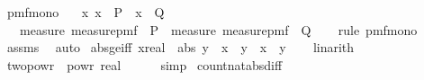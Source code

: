 \begin{isabellebody}
%
\endisatagproof
{\isafoldproof}%
%
\isadelimproof
\isanewline
%
\endisadelimproof
\isanewline
{}\isamarkupfalse%
\ pmf{\isacharunderscore}{\kern0pt}mono{\isacharcolon}{\kern0pt}\isanewline
\ \ \ {\isachardoublequoteopen}{\isasymAnd}x{\isachardot}{\kern0pt}\ x\ {\isasymin}\ P\ {\isasymLongrightarrow}\ x\ {\isasymin}\ Q{\isachardoublequoteclose}\isanewline
\ \ \ {\isachardoublequoteopen}measure\ {\isacharparenleft}{\kern0pt}measure{\isacharunderscore}{\kern0pt}pmf\ {\isasymOmega}{\isacharparenright}{\kern0pt}\ P\ {\isasymle}\ measure\ {\isacharparenleft}{\kern0pt}measure{\isacharunderscore}{\kern0pt}pmf\ {\isasymOmega}{\isacharparenright}{\kern0pt}\ Q{\isachardoublequoteclose}\isanewline
%
\isadelimproof
\ \ %
\endisadelimproof
%
\isatagproof
{}\isamarkupfalse%
\ {\isacharparenleft}{\kern0pt}rule\ pmf{\isacharunderscore}{\kern0pt}mono{\isacharunderscore}{\kern0pt}{}{\isacharparenright}{\kern0pt}\ \isamarkupfalse%
\ assms\ \isamarkupfalse%
\ auto%
\endisatagproof
{\isafoldproof}%
%
\isadelimproof
\isanewline
%
\endisadelimproof
\isanewline
{}\isamarkupfalse%
\ abs{\isacharunderscore}{\kern0pt}ge{\isacharunderscore}{\kern0pt}iff{\isacharcolon}{\kern0pt}\ {\isachardoublequoteopen}{\isacharparenleft}{\kern0pt}{\isacharparenleft}{\kern0pt}x{\isacharcolon}{\kern0pt}{\isacharcolon}{\kern0pt}real{\isacharparenright}{\kern0pt}\ {\isasymle}\ abs\ y{\isacharparenright}{\kern0pt}\ {\isacharequal}{\kern0pt}\ {\isacharparenleft}{\kern0pt}x\ {\isasymle}\ y\ {\isasymor}\ x\ {\isasymle}\ {\isacharminus}{\kern0pt}y{\isacharparenright}{\kern0pt}{\isachardoublequoteclose}\isanewline
%
\isadelimproof
\ \ %
\endisadelimproof
%
\isatagproof
{}\isamarkupfalse%
\ linarith%
\endisatagproof
{\isafoldproof}%
%
\isadelimproof
\isanewline
%
\endisadelimproof
\isanewline
{}\isamarkupfalse%
\ two{\isacharunderscore}{\kern0pt}powr{\isacharunderscore}{\kern0pt}{}{\isacharcolon}{\kern0pt}\ {\isachardoublequoteopen}{}\ powr\ {\isacharparenleft}{\kern0pt}{}{\isacharcolon}{\kern0pt}{\isacharcolon}{\kern0pt}real{\isacharparenright}{\kern0pt}\ {\isacharequal}{\kern0pt}\ {}{\isachardoublequoteclose}\isanewline
%
\isadelimproof
\ \ %
\endisadelimproof
%
\isatagproof
{}\isamarkupfalse%
\ simp%
\endisatagproof
{\isafoldproof}%
%
\isadelimproof
\isanewline
%
\endisadelimproof
\isanewline
{}\isamarkupfalse%
\ count{\isacharunderscore}{\kern0pt}nat{\isacharunderscore}{\kern0pt}abs{\isacharunderscore}{\kern0pt}diff{\isacharunderscore}{\kern0pt}{}{\isacharcolon}{\kern0pt}\isanewline

\end{isabellebody}
